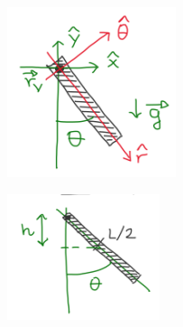 \begin{example}
\begin{figure}[h!]
\begin{subfigure}{.20\textwidth}
            \includegraphics[width=\textwidth]{images/ess-pendolo-1.png}
        \end{subfigure}
        \hspace{30pt}
        \begin{subfigure}{.20\textwidth}
            \centering
            \includegraphics[width=\textwidth]{images/ess-pendolo-2.png}
        \end{subfigure}
    \end{figure}
\end{example}
